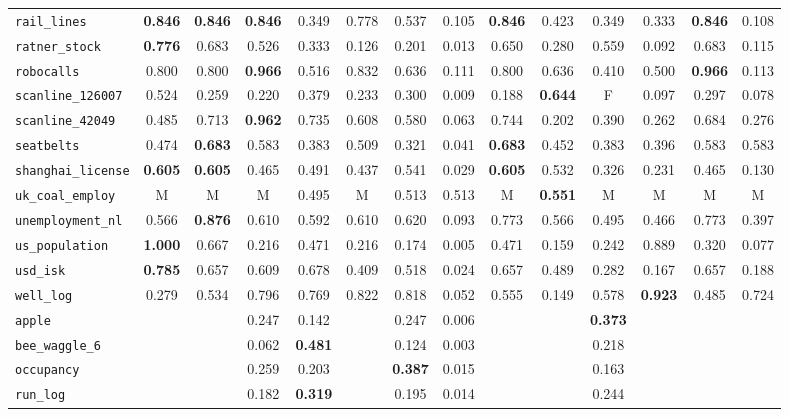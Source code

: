 \begin{tabular}{lccccccccccccc}
\verb+rail_lines+ & \textbf{0.846} & \textbf{0.846} & \textbf{0.846} & 0.349 & 0.778 & 0.537 & 0.105 & \textbf{0.846} & 0.423 & 0.349 & 0.333 & \textbf{0.846} & 0.108\\
\verb+ratner_stock+ & \textbf{0.776} & 0.683 & 0.526 & 0.333 & 0.126 & 0.201 & 0.013 & 0.650 & 0.280 & 0.559 & 0.092 & 0.683 & 0.115\\
\verb+robocalls+ & 0.800 & 0.800 & \textbf{0.966} & 0.516 & 0.832 & 0.636 & 0.111 & 0.800 & 0.636 & 0.410 & 0.500 & \textbf{0.966} & 0.113\\
\verb+scanline_126007+ & 0.524 & 0.259 & 0.220 & 0.379 & 0.233 & 0.300 & 0.009 & 0.188 & \textbf{0.644} & F & 0.097 & 0.297 & 0.078\\
\verb+scanline_42049+ & 0.485 & 0.713 & \textbf{0.962} & 0.735 & 0.608 & 0.580 & 0.063 & 0.744 & 0.202 & 0.390 & 0.262 & 0.684 & 0.276\\
\verb+seatbelts+ & 0.474 & \textbf{0.683} & 0.583 & 0.383 & 0.509 & 0.321 & 0.041 & \textbf{0.683} & 0.452 & 0.383 & 0.396 & 0.583 & 0.583\\
\verb+shanghai_license+ & \textbf{0.605} & \textbf{0.605} & 0.465 & 0.491 & 0.437 & 0.541 & 0.029 & \textbf{0.605} & 0.532 & 0.326 & 0.231 & 0.465 & 0.130\\
\verb+uk_coal_employ+ & M & M & M & 0.495 & M & 0.513 & 0.513 & M & \textbf{0.551} & M & M & M & M\\
\verb+unemployment_nl+ & 0.566 & \textbf{0.876} & 0.610 & 0.592 & 0.610 & 0.620 & 0.093 & 0.773 & 0.566 & 0.495 & 0.466 & 0.773 & 0.397\\
\verb+us_population+ & \textbf{1.000} & 0.667 & 0.216 & 0.471 & 0.216 & 0.174 & 0.005 & 0.471 & 0.159 & 0.242 & 0.889 & 0.320 & 0.077\\
\verb+usd_isk+ & \textbf{0.785} & 0.657 & 0.609 & 0.678 & 0.409 & 0.518 & 0.024 & 0.657 & 0.489 & 0.282 & 0.167 & 0.657 & 0.188\\
\verb+well_log+ & 0.279 & 0.534 & 0.796 & 0.769 & 0.822 & 0.818 & 0.052 & 0.555 & 0.149 & 0.578 & \textbf{0.923} & 0.485 & 0.724\\
\hline
\verb+apple+ &  &  & 0.247 & 0.142 &  & 0.247 & 0.006 &  &  & \textbf{0.373} &  &  & \\
\verb+bee_waggle_6+ &  &  & 0.062 & \textbf{0.481} &  & 0.124 & 0.003 &  &  & 0.218 &  &  & \\
\verb+occupancy+ &  &  & 0.259 & 0.203 &  & \textbf{0.387} & 0.015 &  &  & 0.163 &  &  & \\
\verb+run_log+ &  &  & 0.182 & \textbf{0.319} &  & 0.195 & 0.014 &  &  & 0.244 &  &  & \\
\hline
\end{tabular}
